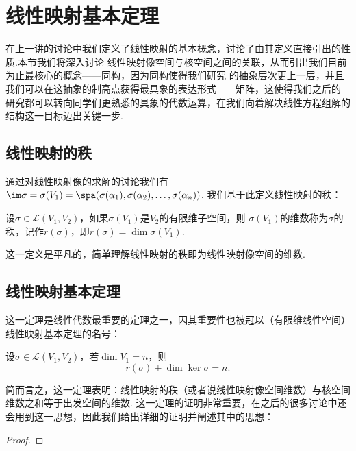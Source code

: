 \chapter{线性映射基本定理}

在上一讲的讨论中我们定义了线性映射的基本概念，讨论了由其定义直接引出的性质.本节我们将深入讨论
线性映射像空间与核空间之间的关联，从而引出我们目前为止最核心的概念——同构，因为同构使得我们研究
的抽象层次更上一层，并且我们可以在这抽象的制高点获得最具象的表达形式——矩阵，这使得我们之后的
研究都可以转向同学们更熟悉的具象的代数运算，在我们向着解决线性方程组解的结构这一目标迈出关键一步.

\section{线性映射的秩}
通过对线性映射像的求解的讨论我们有
$\im \sigma=\sigma(V_1)=\spa(\sigma(\alpha_1),\sigma(\alpha_2),\ldots,\sigma(\alpha_n))$.
我们基于此定义线性映射的秩：
\begin{definition}
    设$\sigma\in \mathcal{L}(V_1,V_2)$，如果$\sigma(V_1)$是$V_2$的有限维子空间，则
    $\sigma(V_1)$的维数称为$\sigma$的秩，记作$r(\sigma)$，即$r(\sigma)=\dim \sigma(V_1)$.
\end{definition}

这一定义是平凡的，简单理解线性映射的秩即为线性映射像空间的维数.

\section{线性映射基本定理}
这一定理是线性代数最重要的定理之一，因其重要性也被冠以（有限维线性空间）线性映射基本定理的名号：
\begin{theorem}\label{thm:6:线性映射基本定理}
    设$\sigma \in \mathcal{L}(V_1,V_2)$，若$\dim V_1=n$，则
    \[r(\sigma)+\dim\ker\sigma=n.\]
\end{theorem}
简而言之，这一定理表明：线性映射的秩（或者说线性映射像空间维数）与核空间维数之和等于出发空间的维数.
这一定理的证明非常重要，在之后的很多讨论中还会用到这一思想，因此我们给出详细的证明并阐述其中的思想：

\begin{proof}
    
\end{proof}

